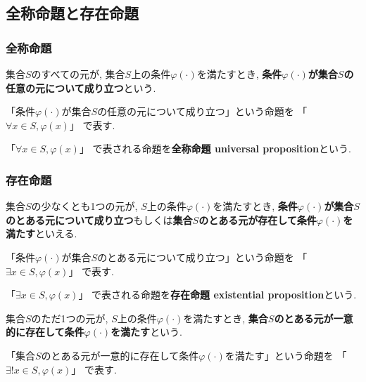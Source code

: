 \subsection{全称命題と存在命題}
\subsubsection{全称命題}
\begin{usage}
集合$S$のすべての元が, 集合$S$上の条件$\varphi(\cdot)$を満たすとき, {\bf 条件$\varphi(\cdot)$が集合$S$の任意の元について成り立つ}という.
\end{usage}
\begin{Notation}
「条件$\varphi(\cdot)$が集合$S$の任意の元について成り立つ」という命題を
「$
\forall x\in S,\varphi(x)
$」
で表す. 
\end{Notation}
\begin{caution}
「$
\forall x\in S,\varphi(x)
$」
で表される命題を{\bf 全称命題 universal proposition}という.
\end{caution}
\subsubsection{存在命題}
\begin{usage}
集合$S$の少なくとも1つの元が, $S$上の条件$\varphi(\cdot)$を満たすとき, {\bf 条件$\varphi(\cdot)$が集合$S$のとある元について成り立つ}もしくは{\bf 集合$S$のとある元が存在して条件$\varphi(\cdot)$を満たす}といえる.
\end{usage}
\begin{Notation}
「条件$\varphi(\cdot)$が集合$S$のとある元について成り立つ」という命題を
「$
\exists x\in S,\varphi(x)
$」
で表す.
\end{Notation}
\begin{caution}
「$
\exists x\in S,\varphi(x)
$」
で表される命題を{\bf 存在命題 existential proposition}という.
\end{caution}
\begin{usage}
集合$S$のただ1つの元が, $S$上の条件$\varphi(\cdot)$を満たすとき, {\bf 集合$S$のとある元が一意的に存在して条件$\varphi(\cdot)$を満たす}という.
\end{usage}
\begin{Notation}
「集合$S$のとある元が一意的に存在して条件$\varphi(\cdot)$を満たす」という命題を
「$
\exists! x\in S,\varphi(x)
$」
で表す.
\end{Notation}
\begin{comment}
\begin{example}
「いくらでも大きい素数が存在する」という
主張は「任意の自然数$N$に対して, それより大きい$n$が存在して, 条件『$n$は素数である』を満たす」という命題で述べられ,
条件「$n$は素数である」を$P(n)$で表したとき
\[
\forall N\in
\]
\end{example}
\end{comment}




